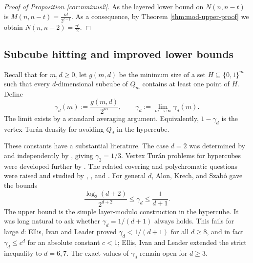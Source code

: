 \documentclass[11pt]{article}
\theoremstyle{definition}
\theoremstyle{remark}
\begin{document}
\begin{proof}[Proof of Proposition \ref{cor:nminus2}]
As the layered lower bound on $N(n,n-t)$ is $M(n,n-t)=\frac{n!}{2^{t-1}}$.  As a consequence,  by Theorem \ref{thm:mod-upper-proof} we obtain $N(n,n-2)=\frac{n!}{2}$.      
\end{proof}




\subsection{Subcube hitting and improved lower bounds}


Recall that for $m,d\ge 0$, let $g(m,d)$ be the minimum size of a set $H\subseteq\{0,1\}^m$ such that every $d$-dimensional subcube of $Q_m$ contains at least one point of $H$.  Define
\[
   \gamma_d(m):=\frac{g(m,d)}{2^m},
   \qquad
   \gamma_d:=\lim_{m\to\infty}\gamma_d(m).
\]
The limit exists by a standard averaging argument.  Equivalently, $1-\gamma_d$ is the vertex Tur\'an density for avoiding $Q_d$ in the hypercube.

These constants have a substantial literature.  The case $d=2$ was determined by \citet{Kostochka1976} and independently by \citet{JohnsonEntringer1989}, giving $\gamma_2=1/3$.  Vertex Tur\'an problems for hypercubes were developed further by \citet{JohnsonTalbot2010}.  The related covering and polychromatic questions were raised and studied by \citet{AlonKrechSzabo2007}, \citet{Offner2008}, and \citet{OzkahyaStanton2015}.  For general $d$, Alon, Krech, and Szabó \cite{AlonKrechSzabo2007} gave the bounds
\[
   \frac{\log_2(d+2)}{2^{d+2}}
   \le \gamma_d\le \frac1{d+1}.
\]
The upper bound is the simple layer-modulo construction in the hypercube.  It was long natural to ask whether $\gamma_d=1/(d+1)$ always holds.  This fails for large $d$: Ellis, Ivan and Leader \cite{EllisIvanLeader2024} proved $\gamma_d<1/(d+1)$ for all $d\ge 8$, and in fact $\gamma_d\le c^d$ for an absolute constant $c<1$; Ellis, Ivan and Leader \cite{EllisIvanLeader2025} extended the strict inequality to $d=6,7$.  The exact values of $\gamma_d$ remain open for $d\ge 3$.
\end{document}
